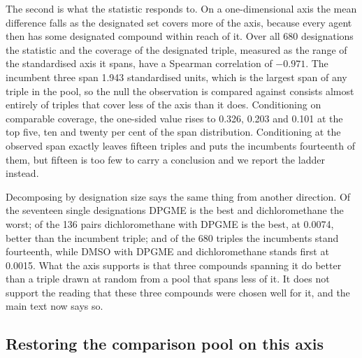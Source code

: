 \documentclass[11pt,a4paper]{article}
\begin{document}
The second is what the statistic responds to. On a one-dimensional axis the mean
difference falls as the designated set covers more of the axis, because every
agent then has some designated compound within reach of it. Over all 680
designations the statistic and the coverage of the designated triple, measured
as the range of the standardised axis it spans, have a Spearman correlation of
$-0.971$. The incumbent three span 1.943 standardised units, which is the
largest span of any triple in the pool, so the null the observation is compared
against consists almost entirely of triples that cover less of the axis than it
does. Conditioning on comparable coverage, the one-sided value rises to 0.326,
0.203 and 0.101 at the top five, ten and twenty per cent of the span
distribution. Conditioning at the observed span exactly leaves fifteen triples
and puts the incumbents fourteenth of them, but fifteen is too few to carry a
conclusion and we report the ladder instead.

Decomposing by designation size says the same thing from another direction.
Of the seventeen single designations DPGME is the best and dichloromethane the
worst; of the 136 pairs dichloromethane with DPGME is the best, at 0.0074,
better than the incumbent triple; and of the 680 triples the incumbents stand
fourteenth, while DMSO with DPGME and dichloromethane stands first at 0.0015.
What the axis supports is that three compounds spanning it do better than a
triple drawn at random from a pool that spans less of it. It does not support
the reading that these three compounds were chosen well for it, and the main
text now says so.



\begin{table}[htb]
  \centering
  \caption{Nearest incumbent simulant and nearest compound of the non-agent pool
  for each agent on the volatility axis. $\Delta$ is the gap in
  $\log_{10}(P/\mathrm{mmHg})$. Where the last two columns name the same
  compound, a simulant is the nearest of the pool; where they differ, an
  interferent is.}
  \label{tab:vpairing}
  \small

\end{table}

\subsection{Restoring the comparison pool on this axis}
\label{meth:volniosh}
\end{document}
